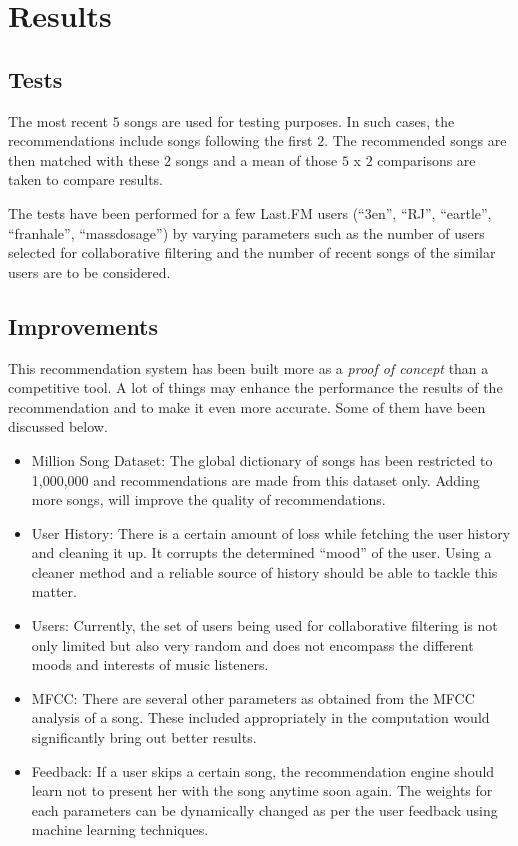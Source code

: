 \chapter{Results}
	\section{Tests}
		The most recent \(5\) songs are used for testing purposes. In such cases, the recommendations include songs following the first \(2\). The recommended songs are then matched with these \(2\) songs and a mean of those \(5\) x \(2\) comparisons are taken to compare results.
		
		The tests have been performed for a few Last.FM users (``3en'', ``RJ'', ``eartle'', ``franhale'', ``massdosage'') by varying parameters such as the number of users selected for collaborative filtering and the number of recent songs of the similar users are to be considered.
	
	\section{Improvements}
		This recommendation system has been built more as a \emph{proof of concept} than a competitive tool. A lot of things may enhance the performance the results of the recommendation and to make it even more accurate. Some of them have been discussed below.

 \begin{itemize}
 	\item Million Song Dataset: The global dictionary of songs has been restricted to 1,000,000 and recommendations are made from this dataset only. Adding more songs, will improve the quality of recommendations.
 	\item User History: There is a certain amount of loss while fetching the user history and cleaning it up. It corrupts the determined ``mood'' of the user. Using a cleaner method and a reliable source of history should be able to tackle this matter.
 	\item Users: Currently, the set of users being used for collaborative filtering is not only limited but also very random and does not encompass the different moods and interests of music listeners.
 	\item MFCC: There are several other parameters as obtained from the MFCC analysis of a song. These included appropriately in the computation would significantly bring out better results.
 	\item Feedback: If a user skips a certain song, the recommendation engine should learn not to present her with the song anytime soon again. The weights for each parameters can be dynamically changed as per the user feedback using machine learning techniques.
 \end{itemize} 
	
